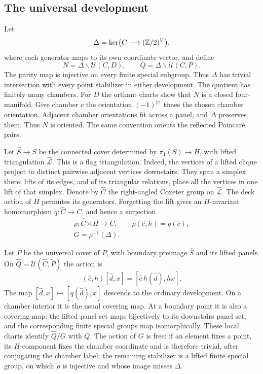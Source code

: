 \subsection{The universal development}
\label{rf:universal}

Let
\[
 \Delta=\ker\bigl(C\longrightarrow(\mathbb Z/2)^V\bigr),
\]
where each generator maps to its own coordinate vector, and define
\[
 N=\Delta\backslash\mathcal U(C,D),\qquad
 Q=\Delta\backslash\mathcal U(C,P).
\]
The parity map is injective on every finite special subgroup.
Thus $\Delta$ has trivial intersection with every point stabilizer
in either development.  The quotient has finitely many chambers.
For $D$ the orthant charts show that $N$ is a closed four-manifold.
Give chamber $c$ the orientation $(-1)^{|c|}$ times the chosen chamber
orientation.  Adjacent chamber orientations fit across a panel, and
$\Delta$ preserves them.  Thus $N$ is oriented.  The same convention
orients the reflected Poincar\'e pairs.

Let $\widehat S\to S$ be the connected cover determined by
$\pi_1(S)\to H$, with lifted triangulation $\widehat{\mathcal L}$.
This is a flag triangulation.  Indeed, the vertices of a lifted clique
project to distinct pairwise adjacent vertices downstairs.  They span
a simplex there; lifts of its edges, and of its triangular relations,
place all the vertices in one lift of that simplex.  Denote by
$\widehat C$ the right-angled Coxeter group on
$\widehat{\mathcal L}$.  The deck action of $H$ permutes its generators.
Forgetting the lift gives an $H$-invariant homomorphism
$q:\widehat C\to C$, and hence a surjection
\begin{equation}
 \label{rf:group}
 \begin{gathered}
 \rho:\widehat C\rtimes H\longrightarrow C,
 \qquad \rho(\widehat c,h)=q(\widehat c),\\
 G=\rho^{-1}(\Delta).
 \end{gathered}
\end{equation}

Let $\widetilde P$ be the universal cover of $P$, with boundary
preimage $\widehat S$ and its lifted panels.  On
$\widehat Q=\mathcal U(\widehat C,\widetilde P)$ the action is
\[
 (\widehat c,h)[\widehat d,x]
     =[\widehat c\,h(\widehat d),hx].
\]
The map $[\widehat d,x]\mapsto[q(\widehat d),\overline x]$ descends
to the ordinary development.  On a chamber interior it is the usual
covering map.  At a boundary point it is also a covering map: the
lifted panel set maps bijectively to its downstairs panel set, and
the corresponding finite special groups map isomorphically.  These
local charts identify $\widehat Q/G$ with $Q$.  The action of $G$ is
free: if an element fixes a point, its $H$-component fixes the chamber
coordinate and is therefore trivial, after conjugating the chamber
label; the remaining stabilizer is a lifted finite special group,
on which $\rho$ is injective and whose image misses $\Delta$.

